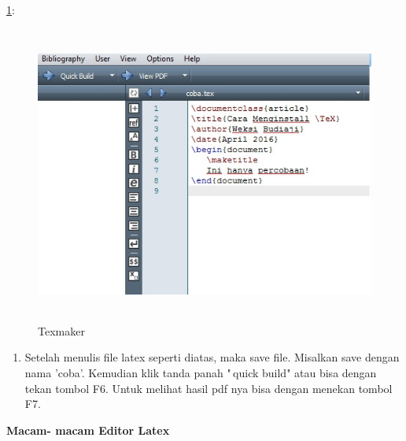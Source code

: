 \ref{image1.jpg}:
\begin{figure}[ht]
	\centerline{\includegraphics[width=13.54cm,height=9.78cm]{gambar/image1.jpg}}
\caption{Texmaker}
\label{image1.jpg}
\end{figure}

\begin{enumerate}
\setcounter{enumi}{\thenumberedCntC}
\item Setelah menulis file latex seperti diatas, maka save file. Misalkan save dengan nama 'coba'. Kemudian klik tanda panah "\,quick build" atau bisa dengan tekan tombol F6. Untuk melihat hasil pdf nya bisa dengan menekan tombol F7.
\setcounter{numberedCntC}{\theenumi}
\end{enumerate}

\textbf{Macam- macam Editor Latex}

